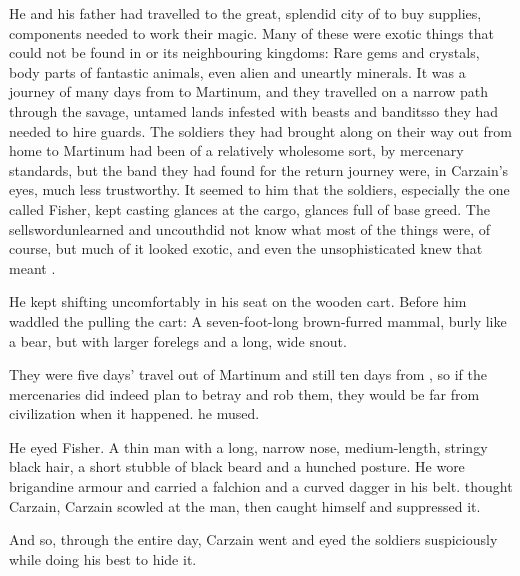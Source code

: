 He and his father had travelled to the great, splendid city of  to buy supplies, components needed to work their magic. 
Many of these were exotic things that could not be found in  or its neighbouring kingdoms: Rare gems and crystals, body parts of fantastic animals, even alien and uneartly minerals. 
It was a journey of many days from  to Martinum, 
and they travelled on a narrow path through the \dash savage, untamed lands infested with beasts and bandits\dash so they had needed to hire guards. 
The soldiers they had brought along on their way out from home to Martinum had been of a relatively wholesome sort, by mercenary standards, but the band they had found for the return journey were, in Carzain's eyes, much less trustworthy. 
It seemed to him that the soldiers, especially the one called Fisher, kept casting glances at the cargo, glances full of base greed. 
The sellsword\dash unlearned and uncouth\dash did not know what most of the things were, of course, but much of it looked exotic, and even the unsophisticated knew that  meant . 

He kept shifting uncomfortably in his seat on the wooden cart. 
Before him waddled the  pulling the cart: 
A seven-foot-long brown-furred mammal, burly like a bear, but with larger forelegs and a long, wide snout. 

They were five days' travel out of Martinum and still ten days from \Redglen{}, so if the mercenaries did indeed plan to betray and rob them, they would be far from civilization when it happened. 
 he mused. 


He eyed Fisher. 
A thin man with a long, narrow nose, medium-length, stringy black hair, a short stubble of black beard and a hunched posture. 
He wore brigandine armour and carried 
a falchion and a curved dagger in his belt. 
 thought Carzain, 
Carzain scowled at the man, then caught himself and suppressed it. 

And so, through the entire day, Carzain went and eyed the soldiers suspiciously while doing his best to hide it. 

